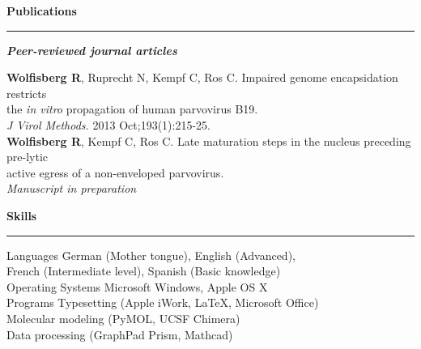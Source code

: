 \clearpage
{}

\large
\textbf{Publications}
\noindent\rule[3mm]{\linewidth}{1pt}

\normalsize


\vspace{-0.25cm}
\textbf{\emph{Peer-reviewed journal articles}} \\[0.3 cm]

\begin{addmargin}{0.025\textwidth}
\textbf{Wolfisberg R}, Ruprecht N, Kempf C, Ros C. Impaired genome encapsidation
restricts \\ the \textit{in vitro} propagation of human parvovirus B19. \\
\textit{J Virol Methods.} 2013 Oct;193(1):215-25. \\[0.3 cm]

\textbf{Wolfisberg R}, Kempf C, Ros C. Late maturation steps in the nucleus preceding pre-lytic\\
 active egress of a non-enveloped parvovirus.\\ 
 \textit{Manuscript in preparation}
\end{addmargin}


\vspace{0.575 cm}
\large
\textbf{Skills}
\noindent\rule[3mm]{\linewidth}{1pt}

\normalsize
\vspace{-0.5 cm}
\begin{tabbing}
Languages \hspace{2.479 cm} \= German (Mother tongue), English (Advanced), \\
\> French (Intermediate level), Spanish (Basic knowledge) \\ [0.15 cm]
Operating Systems \> Microsoft Windows, Apple OS X \\ [0.15cm]
Programs \> Typesetting (Apple iWork, \LaTeX, Microsoft Office) \\
\> Molecular modeling (PyMOL, UCSF Chimera)\\
\> Data processing (GraphPad Prism, Mathcad)
\end{tabbing}






